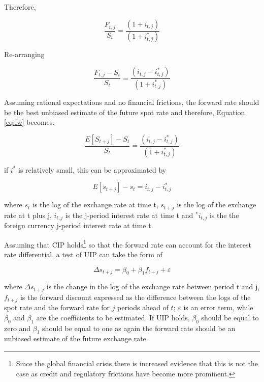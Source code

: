 \documentclass[12pt, a4paper, oneside]{article}\usepackage[]{graphicx}\usepackage[]{color}
\begin{document}
Therefore, 

\begin{equation}
\frac{F_{t,j}}{S_t} = \frac{(1 + i_{t, j})}{(1 + i_{t, j}^*)} 
\end{equation}

 Re-arranging

\begin{equation}
\label{eq:fw}
\frac{F_{t,j} - S_t}{S_t} = \frac{(i_{t,j} - i_{t,j}^*)}{(1 + i_{t,j}^*)} 
 \end{equation}

Assuming rational expectations and no financial frictions, the forward rate should be the best unbiased estimate of the future spot rate and therefore, Equation \ref{eq:fw} becomes.  

\begin{equation}
\frac{E[S_{t+j}] - S_t}{S_t} = \frac{(i_{t, j} - i_{t, j}^*)}{(1 + i_{t, j}^*)}
\label{eq:UIP1}
\end{equation} 

if $i^*$ is relatively small, this can be approximated by 

\begin{equation}
E[s_{t+j}] - s_t = i_{t,j} - i_{t,j}^* 
\end{equation} 

where $s_t$ is the log of the exchange rate at time t, $s_{t + j}$ is the log of the exchange rate at t plus j, $i_{t, j}$ is the j-period interest rate at time t and $^*i_{t, j}$ is the the foreign currency j-period interest rate at time t.  

Assuming that CIP holds\footnote{Since the global financial crisis there is increased evidence that this is not the case as credit and regulatory frictions have become more prominent.} so that the forward rate can account for the interest rate differential, a test of UIP can take the form of 

\begin{equation}
\label{eq:uip2}
\Delta s_{t + j} = \beta_0 +\beta_1 f_{t+j} + \varepsilon
\end{equation} 

where $\Delta s_{t + j}$ is the change in the log of the exchange rate between period t and j, $f_{t+j}$ is the forward discount expressed as the difference between the logs of the spot rate and the forward rate for $j$ periods ahead of $t$; $\varepsilon$ is an error term, while $\beta_0$ and $\beta_1$ are the coefficients to be estimated.  If UIP holds, $\beta_0$ should be equal to zero and $\beta_1$ should be equal to one as again the forward rate should be an unbiased estimate of the future exchange rate.   
\end{document}
